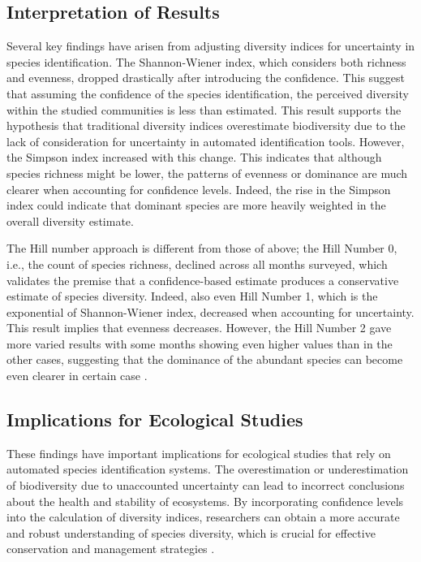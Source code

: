 \documentclass[a4paper,12pt]{article}
\begin{document}
\subsection{Interpretation of Results}
Several key findings have arisen from adjusting diversity indices for uncertainty in species identification. The Shannon-Wiener index, which considers both richness and evenness, dropped drastically after introducing the confidence. This suggest that assuming the confidence of the species identification, the perceived diversity within the studied communities is less than estimated. This result supports the hypothesis that traditional diversity indices overestimate biodiversity due to the lack of consideration for uncertainty in automated identification tools. However, the Simpson index increased with this change. This indicates that although species richness might be lower, the patterns of evenness or dominance are much clearer when accounting for confidence levels. Indeed, the rise in the Simpson index could indicate that dominant species are more heavily weighted in the overall diversity estimate.

The Hill number approach is different from those of above; the Hill Number 0, i.e., the count of species richness, declined across all months surveyed, which validates the premise that a confidence-based estimate produces a conservative estimate of species diversity. Indeed, also even Hill Number 1, which is the exponential of Shannon-Wiener index, decreased when accounting for uncertainty. This result implies that evenness decreases. However, the Hill Number 2 gave more varied results with some months showing even higher values than in the other cases, suggesting that the dominance of the abundant species can become even clearer in certain case \citep{magurran2004measuring}.


\subsection{Implications for Ecological Studies}
These findings have important implications for ecological studies that rely on automated species identification systems. The overestimation or underestimation of biodiversity due to unaccounted uncertainty can lead to incorrect conclusions about the health and stability of ecosystems. By incorporating confidence levels into the calculation of diversity indices, researchers can obtain a more accurate and robust understanding of species diversity, which is crucial for effective conservation and management strategies \citep{arponen2012prioritizing}.
\end{document}
